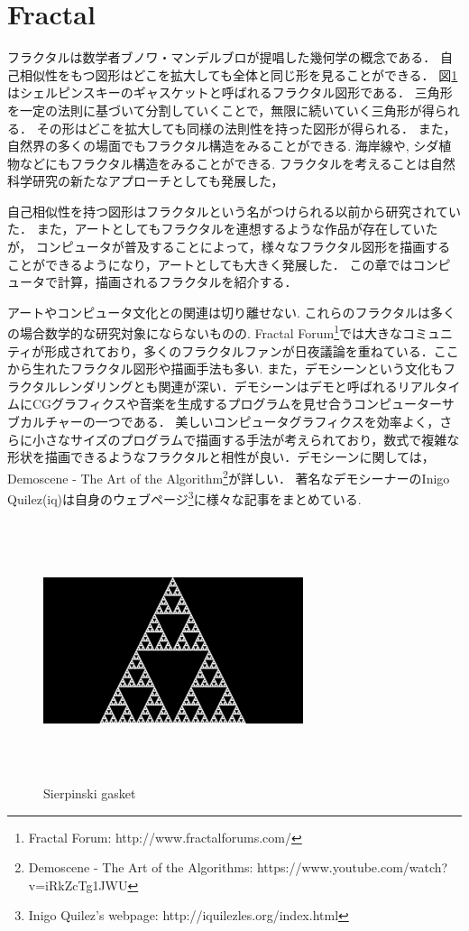 \section{Fractal}

フラクタルは数学者ブノワ・マンデルブロが提唱した幾何学の概念である．
自己相似性をもつ図形はどこを拡大しても全体と同じ形を見ることができる．
図\ref{fig:gasket}はシェルピンスキーのギャスケットと呼ばれるフラクタル図形である．
三角形を一定の法則に基づいて分割していくことで，無限に続いていく三角形が得られる．
その形はどこを拡大しても同様の法則性を持った図形が得られる．
また，自然界の多くの場面でもフラクタル構造をみることができる. 
海岸線や, シダ植物などにもフラクタル構造をみることができる. 
フラクタルを考えることは自然科学研究の新たなアプローチとしても発展した，

自己相似性を持つ図形はフラクタルという名がつけられる以前から研究されていた．
また，アートとしてもフラクタルを連想するような作品が存在していたが，
コンピュータが普及することによって，様々なフラクタル図形を描画することができるようになり，アートとしても大きく発展した．
この章ではコンピュータで計算，描画されるフラクタルを紹介する．

アートやコンピュータ文化との関連は切り離せない. これらのフラクタルは多くの場合数学的な研究対象にならないものの.
Fractal Forum\footnote{Fractal Forum:  http://www.fractalforums.com/}では大きなコミュニティが形成されており，多くのフラクタルファンが日夜議論を重ねている．ここから生れたフラクタル図形や描画手法も多い. 
また，デモシーンという文化もフラクタルレンダリングとも関連が深い．デモシーンはデモと呼ばれるリアルタイムにCGグラフィクスや音楽を生成するプログラムを見せ合うコンピューターサブカルチャーの一つである．
美しいコンピュータグラフィクスを効率よく，さらに小さなサイズのプログラムで描画する手法が考えられており，数式で複雑な形状を描画できるようなフラクタルと相性が良い．デモシーンに関しては，Demoscene - The Art of the Algorithm\footnote{Demoscene - The Art of the Algorithms: https://www.youtube.com/watch?v=iRkZcTg1JWU}が詳しい．
著名なデモシーナーのInigo Quilez(iq)は自身のウェブページ\footnote{Inigo Quilez's webpage: http://iquilezles.org/index.html}に様々な記事をまとめている. 

\begin{figure}[htbp]
 \begin{center}
      \includegraphics[width=3in, height=3in, keepaspectratio]{../img/fractal/gasket.pdf}
    \caption{Sierpinski gasket}
    \label{fig:gasket}
 \end{center}
\end{figure}

